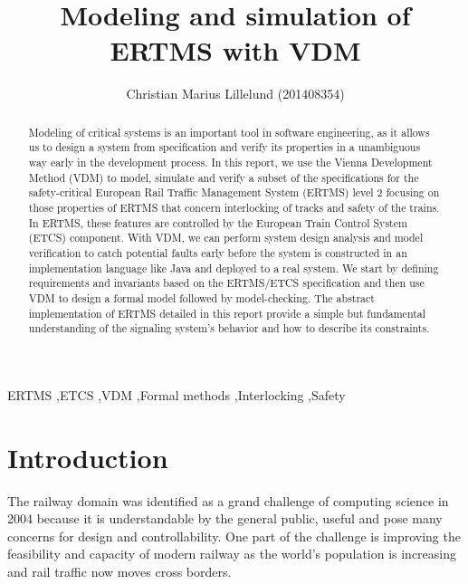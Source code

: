 \documentclass[preprint,12pt]{elsarticle}
\begin{document}
\begin{frontmatter}

\title{Modeling and simulation of ERTMS with VDM}


\author{Christian Marius Lillelund (201408354)}

\address{School of Engineering, Aarhus University}

\address{Course: E18 - Modeling of Critical Systems}

\begin{abstract}
Modeling of critical systems is an important tool in software engineering, as it allows us to design a system
from specification and verify its properties in a unambiguous way early in the development process. In this report, we use the Vienna Development Method (VDM) to model, simulate and verify a subset of the specifications for the safety-critical European Rail Traffic Management System (ERTMS) level 2 focusing on those properties of ERTMS that concern interlocking of tracks and safety of the trains. In ERTMS, these features are controlled by the European Train Control System (ETCS) component. With VDM, we can perform system design analysis and model verification to catch potential faults early before the system is constructed in an implementation language like Java and deployed to a real system. We start by defining requirements and invariants based on the ERTMS/ETCS specification and then use VDM to design a formal model followed by model-checking. The abstract implementation of ERTMS detailed in this report provide a simple but fundamental understanding of the signaling system's behavior and how to describe its constraints.
\end{abstract}

\begin{keyword}
ERTMS \sep ETCS \sep VDM \sep Formal methods \sep Interlocking \sep Safety
\end{keyword}

\end{frontmatter}

\section{Introduction}
\label{S:introduction}
The railway domain was identified as a grand challenge of computing science in 2004 because it is understandable by the general public, useful and pose many concerns for design and controllability. One part of the challenge is improving the feasibility and capacity of modern railway as the world's population is increasing and rail traffic now moves cross borders.
\end{document}
